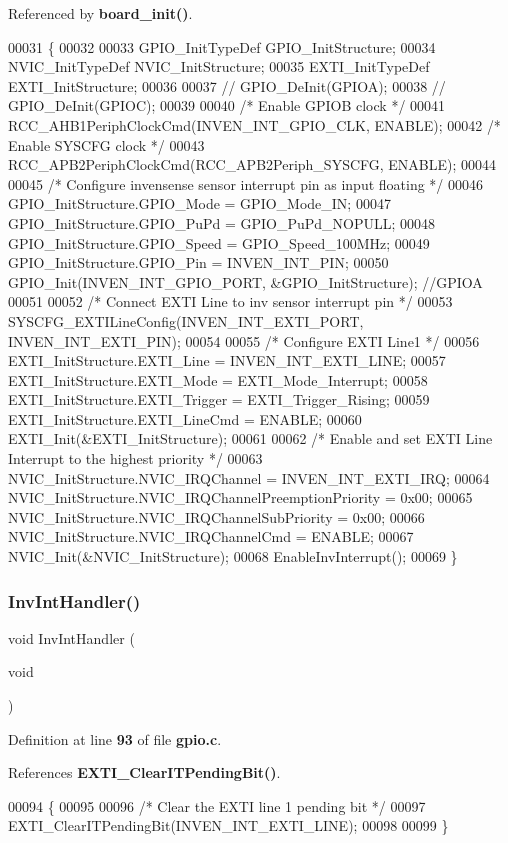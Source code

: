 Referenced by \textbf{ board\+\_\+init()}.


\begin{DoxyCode}
00031 \{
00032 
00033   GPIO_InitTypeDef   GPIO\_InitStructure;
00034   NVIC_InitTypeDef   NVIC_InitStructure;
00035   EXTI_InitTypeDef   EXTI\_InitStructure;
00036 
00037 \textcolor{comment}{//  GPIO\_DeInit(GPIOA);}
00038 \textcolor{comment}{//  GPIO\_DeInit(GPIOC);}
00039   
00040   \textcolor{comment}{/* Enable GPIOB clock */}
00041   RCC_AHB1PeriphClockCmd(INVEN_INT_GPIO_CLK, ENABLE);
00042   \textcolor{comment}{/* Enable SYSCFG clock */}
00043   RCC_APB2PeriphClockCmd(RCC_APB2Periph_SYSCFG, ENABLE);
00044   
00045   \textcolor{comment}{/* Configure invensense sensor interrupt pin as input floating */}
00046   GPIO\_InitStructure.GPIO_Mode = GPIO_Mode_IN;
00047   GPIO\_InitStructure.GPIO_PuPd = GPIO_PuPd_NOPULL;
00048   GPIO\_InitStructure.GPIO_Speed = GPIO_Speed_100MHz;
00049   GPIO\_InitStructure.GPIO_Pin = INVEN_INT_PIN;
00050   GPIO_Init(INVEN_INT_GPIO_PORT, &GPIO\_InitStructure); \textcolor{comment}{//GPIOA}
00051 
00052   \textcolor{comment}{/* Connect EXTI Line to inv sensor interrupt pin */}
00053   SYSCFG_EXTILineConfig(INVEN_INT_EXTI_PORT, INVEN_INT_EXTI_PIN);
00054 
00055   \textcolor{comment}{/* Configure EXTI Line1 */}
00056   EXTI\_InitStructure.EXTI_Line = INVEN_INT_EXTI_LINE;
00057   EXTI\_InitStructure.EXTI_Mode = EXTI_Mode_Interrupt;
00058   EXTI\_InitStructure.EXTI_Trigger = EXTI_Trigger_Rising;
00059   EXTI\_InitStructure.EXTI_LineCmd = ENABLE;
00060   EXTI_Init(&EXTI\_InitStructure);
00061 
00062   \textcolor{comment}{/* Enable and set EXTI Line Interrupt to the highest priority */}
00063   NVIC\_InitStructure.NVIC_IRQChannel = INVEN_INT_EXTI_IRQ;
00064   NVIC\_InitStructure.NVIC_IRQChannelPreemptionPriority = 0x00;
00065   NVIC\_InitStructure.NVIC_IRQChannelSubPriority = 0x00;
00066   NVIC\_InitStructure.NVIC_IRQChannelCmd = ENABLE;
00067   NVIC_Init(&NVIC\_InitStructure);
00068   EnableInvInterrupt();
00069 \}
\end{DoxyCode}
\mbox{\label{gpio_8c_a6da582e1afa9abd4b19e1027556c71ce}} 
\subsubsection{Inv\+Int\+Handler()}
{\footnotesize\ttfamily void Inv\+Int\+Handler (\begin{DoxyParamCaption}\item[{void}]{ }\end{DoxyParamCaption})}



Definition at line \textbf{ 93} of file \textbf{ gpio.\+c}.



References \textbf{ E\+X\+T\+I\+\_\+\+Clear\+I\+T\+Pending\+Bit()}.


\begin{DoxyCode}
00094 \{
00095 
00096   \textcolor{comment}{/* Clear the EXTI line 1 pending bit */}
00097    EXTI_ClearITPendingBit(INVEN_INT_EXTI_LINE);
00098 
00099 \}
\end{DoxyCode}
